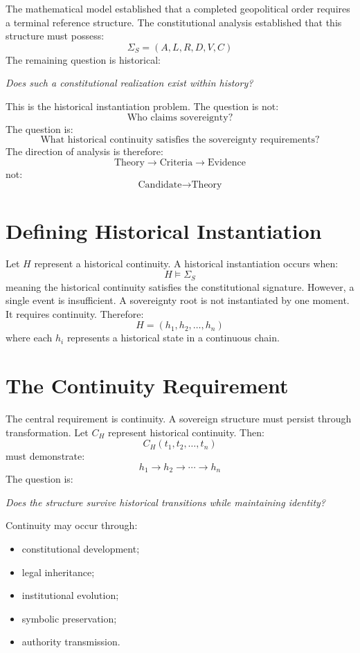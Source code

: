 \documentclass[11pt,openany]{book}
\theoremstyle{plain}
\theoremstyle{definition}
\begin{document}
The mathematical model established that a completed geopolitical order requires a terminal reference structure. The constitutional analysis established that this structure must possess:
\[
\Sigma_S = (A, L, R, D, V, C)
\]
The remaining question is historical:
\begin{center}
\textit{
Does such a constitutional realization exist within history?
}
\end{center}
This is the historical instantiation problem. The question is not:
\[
\text{Who claims sovereignty?}
\]
The question is:
\[
\text{What historical continuity satisfies the sovereignty requirements?}
\]
The direction of analysis is therefore:
\[
\text{Theory} \longrightarrow \text{Criteria} \longrightarrow \text{Evidence}
\]
not:
\[
\text{Candidate} \longrightarrow \text{Theory}
\]

\section{Defining Historical Instantiation}

Let \(H\) represent a historical continuity. A historical instantiation occurs when:
\[
H \models \Sigma_S
\]
meaning the historical continuity satisfies the constitutional signature. However, a single event is insufficient. A sovereignty root is not instantiated by one moment. It requires continuity. Therefore:
\[
H = (h_1, h_2, \ldots, h_n)
\]
where each \(h_i\) represents a historical state in a continuous chain.

\section{The Continuity Requirement}

The central requirement is continuity. A sovereign structure must persist through transformation. Let \(C_H\) represent historical continuity. Then:
\[
C_H(t_1, t_2, \ldots, t_n)
\]
must demonstrate:
\[
h_1 \longrightarrow h_2 \longrightarrow \cdots \longrightarrow h_n
\]
The question is:
\begin{center}
\textit{
Does the structure survive historical transitions while maintaining identity?
}
\end{center}
Continuity may occur through:
\begin{itemize}
\item constitutional development;
\item legal inheritance;
\item institutional evolution;
\item symbolic preservation;
\item authority transmission.
\end{itemize}
\end{document}
